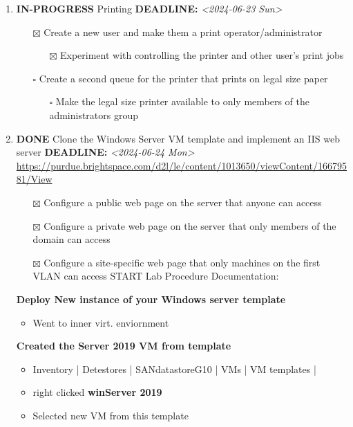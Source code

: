\documentclass[letterpaper]{article}
\begin{document}
\begin{enumerate}
\item {\bfseries\sffamily IN-PROGRESS} Printing
\label{sec:org07baa74}
\noindent\textbf{DEADLINE:} \textit{<2024-06-23 Sun>}\\[0pt]
\begin{itemize}
\item[{$\boxtimes$}] Create a new user and make them a print operator/administrator
\begin{itemize}
\item[{$\boxtimes$}] Experiment with controlling the printer and other user’s print jobs
\end{itemize}
\item[{$\square$}] Create a second queue for the printer that prints on legal size paper
\begin{itemize}
\item[{$\square$}] Make the legal size printer available to only members of the administrators group
\end{itemize}
\end{itemize}
\item {\bfseries\sffamily DONE} Clone the Windows Server VM template and implement an IIS web server
\label{sec:org8450a0d}
\noindent\textbf{DEADLINE:} \textit{<2024-06-24 Mon>}\\[0pt]
\url{https://purdue.brightspace.com/d2l/le/content/1013650/viewContent/16679581/View}
\begin{itemize}
\item[{$\boxtimes$}] Configure a public web page on the server that anyone can access
\item[{$\boxtimes$}] Configure a private web page on the server that only members of the domain can access
\item[{$\boxtimes$}] Configure a site-specific web page that only machines on the first VLAN can access
START Lab Procedure Documentation:
\end{itemize}
\textbf{Deploy New instance of your Windows server template}
\begin{itemize}
\item Went to inner virt. enviornment
\end{itemize}
\textbf{Created the Server 2019 VM from template}
\begin{itemize}
\item Inventory | Detestores | SANdatastoreG10 | VMs | VM templates |
\item right clicked \textbf{winServer 2019}
\item Selected new VM from this template

\end{itemize}
\end{enumerate}
\end{document}
